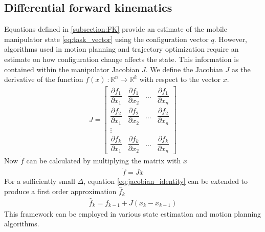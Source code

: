 \documentclass[times, utf8, diplomski, english]{fer}
\begin{document}
\subsection{Differential forward kinematics}
Equations defined in \ref{subsection:FK} provide an estimate of the mobile manipulator state \eqref{eq:task_vector} using the configuration vector $q$. 
However, algorithms used in motion planning and trajectory optimization require an estimate on how configuration change affects the state.
This information is contained within the manipulator Jacobian $J$.
We define the Jacobian $J$ as the derivative of the function $f\left(x\right) \ : \mathbb{R}^n \rightarrow \mathbb{R}^k $ with respect to the vector $x$.
\begin{align}\label{eq:jacobian}
J =
\begin{bmatrix}
    \dfrac{\partial {f_1}}{\partial x_{1}}      & \dfrac{\partial {f}_{1}}{\partial x_{2}}  & \dots & \dfrac{\partial {f}_{1}}{\partial x_{n}}  \\
    \dfrac{\partial{f_2}}{\partial x_{1}}      & \dfrac{\partial {f}_{2}}{\partial x_{2}}  & \dots & \dfrac{\partial {f}_{2}}{\partial x_{n}} \\
    \vdots \\
    \dfrac{\partial {f_k}}{\partial x_{1}}      & \dfrac{\partial {f}_{k}}{\partial x_{2}}  & \dots & \dfrac{\partial {f}_{k}}{\partial x_{n}}
\end{bmatrix}
\end{align}
Now $\dot{f}$ can be calculated by multiplying the matrix with $\dot{x}$
\begin{align} \label{eq:jacobian_identity}
\dot{f} = J \dot{x}
\end{align}
For a sufficiently small $\Delta$, equation \ref{eq:jacobian_identity} can be extended to produce a first order approximation $\hat{f}_k$ 
\begin{align} \label{eq:jacobian_estimate}
\hat{f}_k = f_{k-1} + J\left(x_{k} - x_{k-1}\right)
\end{align}
This framework can be employed in various state estimation and motion planning algorithms.
\newpage
\end{document}
